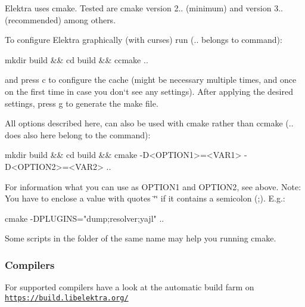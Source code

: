 Elektra uses cmake. Tested are cmake version 2.. (minimum) and version 3.. (recommended) among others.

To configure Elektra graphically (with curses) run ({\ttfamily ..} belongs to command)\+: \begin{DoxyVerb}mkdir build && cd build && ccmake ..
\end{DoxyVerb}


and press \textquotesingle{}c\textquotesingle{} to configure the cache (might be necessary multiple times, and once on the first time in case you don‘t see any settings). After applying the desired settings, press \textquotesingle{}g\textquotesingle{} to generate the make file.

All options described here, can also be used with cmake rather than ccmake ({\ttfamily ..} does also here belong to the command)\+: \begin{DoxyVerb}mkdir build && cd build && cmake -D<OPTION1>=<VAR1> -D<OPTION2>=<VAR2> ..
\end{DoxyVerb}


For information what you can use as {\ttfamily O\+P\+T\+I\+O\+N1} and {\ttfamily O\+P\+T\+I\+O\+N2}, see above. Note\+: You have to enclose a value with quotes {\ttfamily \char`\"{}\char`\"{}} if it contains a semicolon ({\ttfamily ;}). E.\+g.\+: \begin{DoxyVerb}cmake -DPLUGINS="dump;resolver;yajl" ..
\end{DoxyVerb}


Some scripts in the folder of the same name may help you running cmake.

\subsubsection*{Compilers}

For supported compilers have a look at the automatic build farm on \href{https://build.libelektra.org/}{\tt https\+://build.\+libelektra.\+org/}

